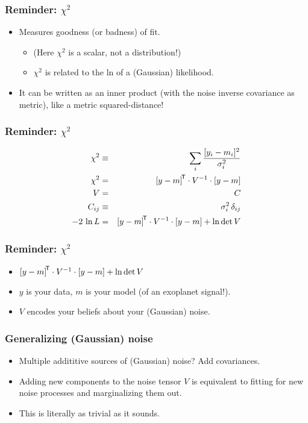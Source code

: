 \documentclass[pdftex]{beamer}
\begin{document}
\begin{frame}
  \frametitle{Reminder: $\chi^2$}
  \begin{itemize}
  \item Measures goodness (or badness) of fit.
    \begin{itemize}
    \item (Here $\chi^2$ is a scalar, not a distribution!)
    \item $\chi^2$ is related to the ln of a (Gaussian) likelihood.
    \end{itemize}
  \item It can be written as an inner product (with the noise inverse
    covariance as metric), like a metric squared-distance!
  \end{itemize}
\end{frame}

\begin{frame}
  \frametitle{Reminder: $\chi^2$}
  \begin{eqnarray}
    \chi^2 &\equiv& \sum_i \frac{[y_i - m_i]^2}{\sigma_i^2}
    \nonumber \\
    \chi^2 &=& {[y - m]}^{\mathsf{\!T}}\cdot V^{-1}\cdot [y - m]
    \nonumber \\
    V &=& C
    \nonumber \\
    C_{ij} &\equiv& \sigma_i^2\,\delta_{ij}
    \nonumber \\
    -2\,\ln L &=& {[y - m]}^{\mathsf{\!T}}\cdot V^{-1}\cdot [y - m] + \ln\det V
    \nonumber
  \end{eqnarray}
\end{frame}

\begin{frame}
  \frametitle{Reminder: $\chi^2$}
  \begin{itemize}
  \item ${[y - m]}^{\mathsf{\!T}}\cdot V^{-1}\cdot [y - m] + \ln\det V$
  \item $y$ is your data, $m$ is your model (of an exoplanet signal!).
  \item $V$ encodes your beliefs about your (Gaussian) noise.
  \end{itemize}
\end{frame}

\begin{frame}
  \frametitle{Generalizing (Gaussian) noise}
  \begin{itemize}
  \item Multiple addititive sources of (Gaussian) noise? Add covariances.
  \item Adding new components to the noise tensor $V$ is
    equivalent to fitting for new noise processes and marginalizing
    them out.
  \item This is literally as trivial as it sounds.
  \end{itemize}
\end{frame}
\end{document}
